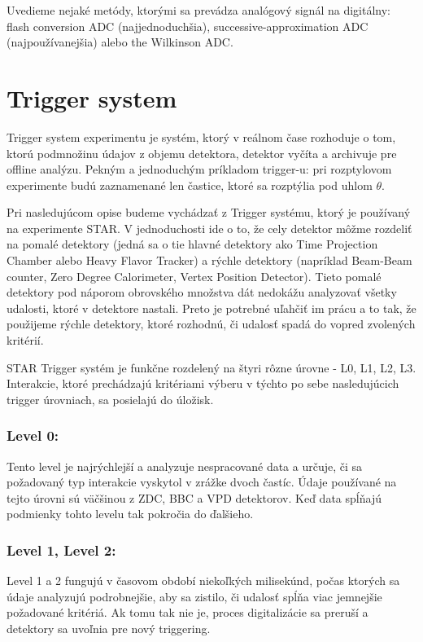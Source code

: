 \documentclass[../../main.tex]{subfiles}
\begin{document}
Uvedieme nejaké metódy, ktorými sa prevádza analógový signál na digitálny: flash conversion ADC (najjednoduchšia),  successive-approximation ADC (najpoužívanejšia) alebo the Wilkinson ADC.

\section{Trigger system }
Trigger system experimentu je systém, ktorý v reálnom čase rozhoduje o tom, ktorú podmnožinu údajov z objemu detektora, detektor vyčíta a archivuje pre offline analýzu. Pekným a jednoduchým príkladom trigger-u: pri rozptylovom experimente budú zaznamenané len častice, ktoré sa rozptýlia pod uhlom $\theta$.

Pri nasledujúcom opise budeme vychádzať z Trigger systému, ktorý je používaný na experimente STAR. V jednoduchosti ide o to, že cely detektor môžme rozdeliť na pomalé detektory (jedná sa o tie hlavné detektory ako Time Projection Chamber alebo Heavy Flavor Tracker) a rýchle detektory (napríklad Beam-Beam counter, Zero Degree Calorimeter, Vertex Position Detector). Tieto pomalé detektory pod náporom obrovského množstva dát nedokážu analyzovať všetky udalosti, ktoré v detektore nastali. Preto je potrebné uľahčiť im prácu a to tak, že použijeme rýchle detektory, ktoré rozhodnú, či udalosť spadá do vopred zvolených kritérií. 

STAR Trigger systém je funkčne rozdelený na štyri rôzne úrovne - L0, L1, L2, L3. Interakcie, ktoré prechádzajú kritériami výberu v týchto po sebe nasledujúcich trigger úrovniach, sa posielajú do úložisk.

\subsubsection{Level 0:}
Tento level je najrýchlejší a analyzuje nespracované data a určuje, či sa požadovaný typ interakcie vyskytol v zrážke dvoch častíc. Údaje používané na tejto úrovni sú väčšinou z ZDC, BBC a VPD detektorov. Keď data spĺňajú podmienky tohto levelu tak pokročia do ďalšieho.

\subsubsection{Level 1, Level 2:}
Level 1 a 2 fungujú v časovom období niekoľkých milisekúnd, počas ktorých sa údaje analyzujú podrobnejšie, aby sa zistilo, či udalosť spĺňa viac jemnejšie požadované kritériá. Ak tomu tak nie je, proces digitalizácie sa preruší a detektory sa uvoľnia pre nový triggering.
\end{document}
